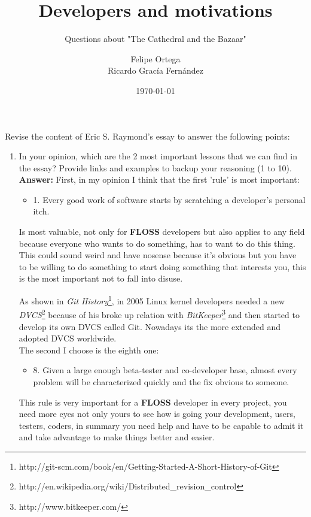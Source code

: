 \documentclass[11pt]{scrartcl}
\title{\textbf{Developers and motivations}}
\subtitle{Questions about "The Cathedral and the Bazaar"}
\author{Felipe Ortega\\
		Ricardo Grac\'ia Fern\'andez}
\date{\today}
\begin{document}
\maketitle

Revise the content of Eric S. Raymond's essay to answer the following points:
	\begin{enumerate}
		\item In your opinion, which are the 2 most important lessons that we can find in the essay? Provide links and examples to backup your reasoning (1 to 10).\\
		
			\textbf{Answer:} First, in my opinion I think that the first 'rule' is most important:
			\begin{itemize}
				\item 1. Every good work of software starts by scratching a developer's personal itch.
			\end{itemize}
			
			\indent Is most valuable, not only for \textbf{FLOSS} developers but also applies to any field because everyone who wants to do something, has to want to do this thing. This could sound weird and have nosense because it's obvious but you have to be willing to do something to start doing something that interests you, this is the most important not to fall into disuse.
			
			\indent As shown in \emph{Git History}\footnote{http://git-scm.com/book/en/Getting-Started-A-Short-History-of-Git}, in 2005 Linux kernel developers needed a new \emph{DVCS}\footnote{http://en.wikipedia.org/wiki/Distributed\_revision\_control} because of his broke up relation with \emph{BitKeeper}\footnote{http://www.bitkeeper.com/} and then started to develop its own DVCS called Git. Nowadays its the more extended and adopted DVCS worldwide.\\
			
			The second I choose is the eighth one:
			\begin{itemize}
				\item 8. Given a large enough beta-tester and co-developer base, almost every problem will be characterized quickly and the fix obvious to someone.
			\end{itemize}
			
			\indent This rule is very important for a \textbf{FLOSS} developer in every project, you need more eyes not only yours to see how is going your development, users, testers, coders, in summary you need help and have to be capable to admit it and take advantage to make things better and easier.
			

\end{enumerate}
\end{document}
